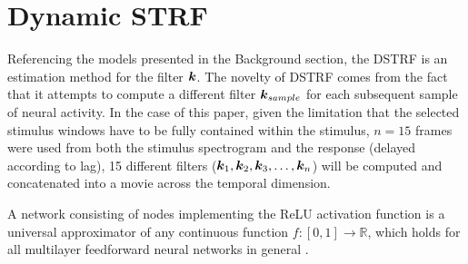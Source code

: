 \section{Dynamic STRF}
Referencing the models presented in the Background section, the DSTRF is an estimation method for the filter $\bm{k}$. The novelty of DSTRF comes from the fact that it attempts to compute a different filter $\bm{k}_{sample}$ for each subsequent sample of neural activity. In the case of this paper, given the limitation that the selected stimulus windows have to be fully contained within the stimulus, $n=15$ frames were used from both the stimulus spectrogram and the response (delayed according to lag), 15 different filters ($\bm{k}_1, \bm{k}_2, \bm{k}_3, \dots, \bm{k}_n$) will be computed and concatenated into a movie across the temporal dimension. 

A network consisting of nodes implementing the ReLU activation function is a universal approximator of any continuous function $f: [0, 1] \rightarrow \mathbb{R}$, which holds for all multilayer feedforward neural networks in general \parencite{hornikMultilayerFeedforwardNetworks1989, huangReLUNetworksAre2020}. 

